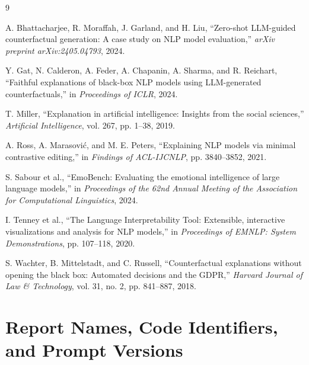 \documentclass[11pt,a4paper]{article}
\begin{document}
\clearpage
\begin{thebibliography}{9}

A. Bhattacharjee, R. Moraffah, J. Garland, and H. Liu,
``Zero-shot LLM-guided counterfactual generation: A case study on NLP model
evaluation,'' \emph{arXiv preprint arXiv:2405.04793}, 2024.

Y. Gat, N. Calderon, A. Feder, A. Chapanin, A. Sharma, and R. Reichart,
``Faithful explanations of black-box NLP models using LLM-generated
counterfactuals,'' in \emph{Proceedings of ICLR}, 2024.

T. Miller,
``Explanation in artificial intelligence: Insights from the social sciences,''
\emph{Artificial Intelligence}, vol. 267, pp. 1--38, 2019.

A. Ross, A. Marasovi\'c, and M. E. Peters,
``Explaining NLP models via minimal contrastive editing,'' in
\emph{Findings of ACL-IJCNLP}, pp. 3840--3852, 2021.

S. Sabour et al.,
``EmoBench: Evaluating the emotional intelligence of large language models,'' in
\emph{Proceedings of the 62nd Annual Meeting of the Association for Computational
Linguistics}, 2024.

I. Tenney et al.,
``The Language Interpretability Tool: Extensible, interactive visualizations and
analysis for NLP models,'' in \emph{Proceedings of EMNLP: System Demonstrations},
pp. 107--118, 2020.

S. Wachter, B. Mittelstadt, and C. Russell,
``Counterfactual explanations without opening the black box: Automated decisions and
the GDPR,'' \emph{Harvard Journal of Law \& Technology}, vol. 31, no. 2,
pp. 841--887, 2018.

\end{thebibliography}

\clearpage
\appendix

\section{Report Names, Code Identifiers, and Prompt Versions}
\label{app:mapping}
\end{document}
